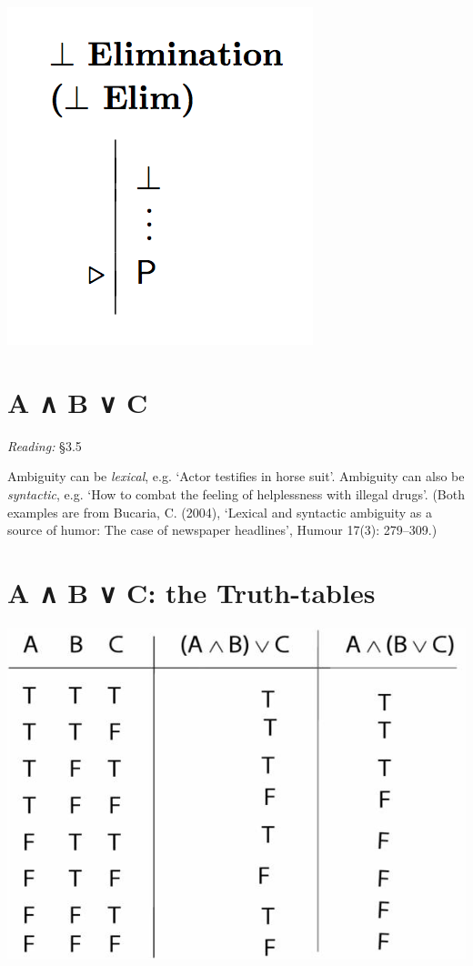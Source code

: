 \documentclass[12pt]{extarticle}
\begin{document}
\begin{multicols*}{3}
\begin{center}
\includegraphics[scale=0.3]{img/rule_contradiction_elim.png}
\end{center}
 
 
\section{A ∧ B ∨ C}
 
\emph{Reading:} §3.5
 
Ambiguity can be \emph{lexical}, e.g. `Actor testifies in horse suit'. Ambiguity can also be \emph{syntactic}, e.g. `How to combat the feeling of helplessness with illegal drugs'. (Both examples are from Bucaria, C. (2004), `Lexical and syntactic ambiguity as a source of humor: The case of newspaper headlines', Humour 17(3): 279--309.)
 
 
 
\section{A ∧ B ∨ C: the Truth-tables}
 
\begin{center}
\includegraphics[scale=0.3]{img/tt_unit_153.png}
\end{center}
 

\end{multicols*}
\end{document}
